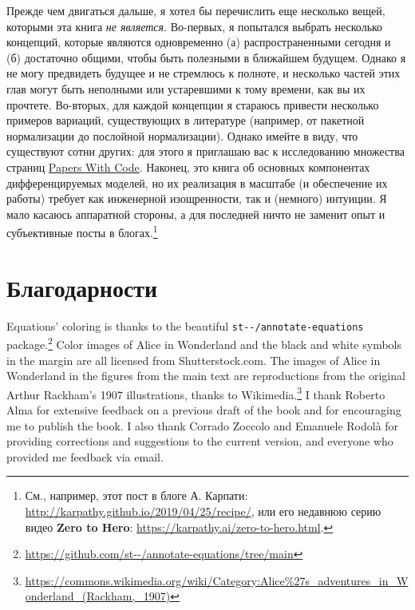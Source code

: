 Прежде чем двигаться дальше, я хотел бы перечислить еще несколько вещей, которыми эта книга \textit{не является}. Во-первых, я попытался выбрать несколько концепций, которые являются одновременно (а) распространенными сегодня и (б) достаточно общими, чтобы быть полезными в ближайшем будущем. Однако я не могу предвидеть будущее и не стремлюсь к полноте, и несколько частей этих глав могут быть неполными или устаревшими к тому времени, как вы их прочтете. Во-вторых, для каждой концепции я стараюсь привести несколько примеров вариаций, существующих в литературе (например, от пакетной нормализации до послойной нормализации). Однако имейте в виду, что существуют сотни других: для этого я приглашаю вас к исследованию множества страниц \href{http://paperswithcode.com}{Papers With Code}. Наконец, это книга об основных компонентах дифференцируемых моделей, но их реализация в масштабе (и обеспечение их работы) требует как инженерной изощренности, так и (немного) интуиции. Я мало касаюсь аппаратной стороны, а для последней ничто не заменит опыт и субъективные посты в блогах.\footnote{См., например, этот пост в блоге А. Карпати: \url{http://karpathy.github.io/2019/04/25/recipe/}, или его недавнюю серию видео \textbf{Zero to Hero}: \url{https://karpathy.ai/zero-to-hero.html}.}

\section*{Благодарности}
%
Equations' coloring is thanks to the beautiful {\footnotesize\verb+st--/annotate-equations+}
package.\footnote{\url{https://github.com/st--/annotate-equations/tree/main}} Color images of Alice in Wonderland and the black and white symbols in the margin are all licensed from Shutterstock.com. The images of Alice in Wonderland in the figures from the main text are reproductions from the original Arthur Rackham's 1907 illustrations, thanks to Wikimedia.\footnote{\url{ https://commons.wikimedia.org/wiki/Category:Alice\%27s\_adventures\_in\_Wonderland\_(Rackham,\_1907)}} I thank Roberto Alma for extensive feedback on a previous draft of the book and for encouraging me to publish the book. I also thank Corrado Zoccolo and Emanuele Rodolà for providing corrections and suggestions to the current version, and everyone who provided me feedback via email.